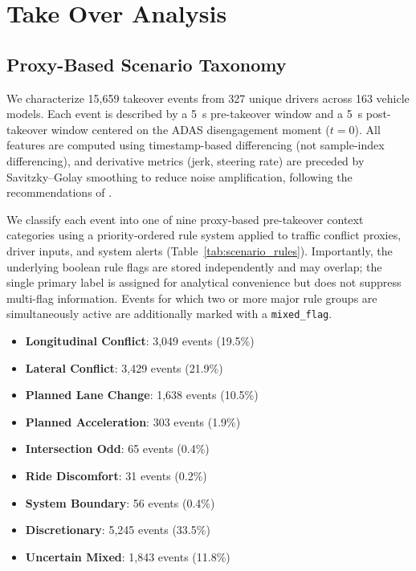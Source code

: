 \section{Take Over Analysis}
\label{sec:takeover_analysis}

\subsection{Proxy-Based Scenario Taxonomy}
\label{subsec:taxonomy}

We characterize 15,659 takeover events from 327 unique drivers across 163 vehicle models. Each event is described by a \SI{5}{s} pre-takeover window and a \SI{5}{s} post-takeover window centered on the ADAS disengagement moment ($t=0$). All features are computed using timestamp-based differencing (not sample-index differencing), and derivative metrics (jerk, steering rate) are preceded by Savitzky--Golay smoothing to reduce noise amplification, following the recommendations of \citet{savitzky1964smoothing}.

We classify each event into one of nine proxy-based pre-takeover context categories using a priority-ordered rule system applied to traffic conflict proxies, driver inputs, and system alerts (Table~\ref{tab:scenario_rules}). Importantly, the underlying boolean rule flags are stored independently and may overlap; the single primary label is assigned for analytical convenience but does not suppress multi-flag information. Events for which two or more major rule groups are simultaneously active are additionally marked with a \texttt{mixed\_flag}.

\begin{itemize}[nosep]
  \item \textbf{Longitudinal Conflict}: 3,049 events (19.5\%)
  \item \textbf{Lateral Conflict}: 3,429 events (21.9\%)
  \item \textbf{Planned Lane Change}: 1,638 events (10.5\%)
  \item \textbf{Planned Acceleration}: 303 events (1.9\%)
  \item \textbf{Intersection Odd}: 65 events (0.4\%)
  \item \textbf{Ride Discomfort}: 31 events (0.2\%)
  \item \textbf{System Boundary}: 56 events (0.4\%)
  \item \textbf{Discretionary}: 5,245 events (33.5\%)
  \item \textbf{Uncertain Mixed}: 1,843 events (11.8\%)
\end{itemize}

